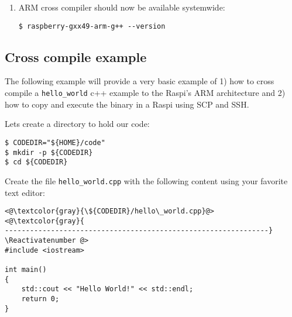 \begin{enumerate}
\item ARM cross compiler should now be available systemwide:

\begin{lstlisting}[]
$ raspberry-gxx49-arm-g++ --version
\end{lstlisting}
\FloatBarrier
\vspace{-5mm}

%

\end{enumerate}

\subsection{Cross compile example}

The following example will provide a very basic example of 1) how to cross compile
a \texttt{hello\_world} c++ example to the \ac{Raspi}'s ARM architecture
and 2) how to copy and execute the binary in a \ac{Raspi} using \ac{SCP} and \ac{SSH}.

Lets create a directory to hold our code:
\begin{lstlisting}[]
$ CODEDIR="${HOME}/code"
$ mkdir -p ${CODEDIR}
$ cd ${CODEDIR}
\end{lstlisting}
\FloatBarrier
\vspace{-5mm}

Create the file \texttt{hello\_world.cpp} with the following content using your
favorite text editor:

\Suppressnumber\begin{lstlisting}[]
<@\textcolor{gray}{\${CODEDIR}/hello\_world.cpp}@>
<@\textcolor{gray}{
---------------------------------------------------------------}
\Reactivatenumber @>
#include <iostream>

int main()
{
    std::cout << "Hello World!" << std::endl;
    return 0;
}
\end{lstlisting}
\FloatBarrier

